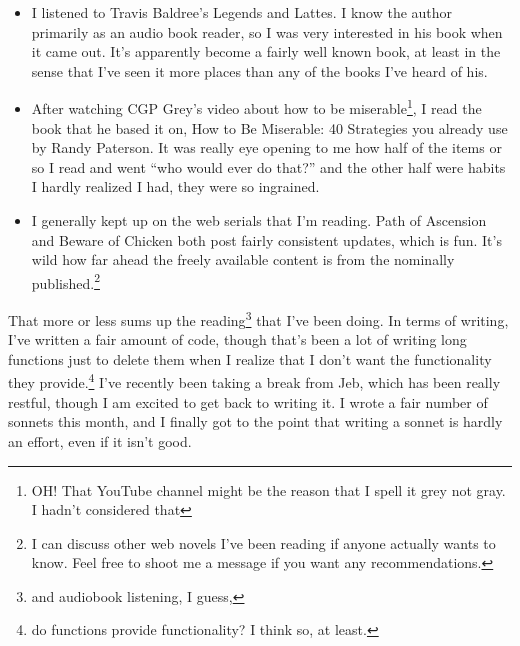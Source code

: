 \documentclass[12pt]{article}[titlepage]
\newcommand{\say}[1]{``#1''}
\newcommand{\1}{\={a}}
\newcommand{\2}{\={e}}
\newcommand{\3}{\={\i}}
\newcommand{\4}{\=o}
\newcommand{\5}{\=u}
\newcommand{\6}{\={A}}
\renewcommand{\,}{\textsuperscript{,}}
\begin{document}
\begin{itemize}
\item I listened to Travis Baldree's Legends and Lattes. I know the author primarily as an audio book reader, so I was very interested in his book when it came out. It's apparently become a fairly well known book, at least in the sense that I've seen it more places than any of the books I've heard of his.
\item After watching CGP Grey's video about how to be miserable\footnote{OH! That YouTube channel might be the reason that I spell it grey not gray. I hadn't considered that}, I read the book that he based it on, How to Be Miserable: 40 Strategies you already use by Randy Paterson. 
It was really eye opening to me how half of the items or so I read and went \say{who would ever do that?} and the other half were habits I hardly realized I had, they were so ingrained.
\item I generally kept up on the web serials that I'm reading. Path of Ascension and Beware of Chicken both post fairly consistent updates, which is fun. It's wild how far ahead the freely available content is from the nominally published.\footnote{I can discuss other web novels I've been reading if anyone actually wants to know. Feel free to shoot me a message if you want any recommendations.}
\end{itemize}

That more or less sums up the reading\footnote{and audiobook listening, I guess,} that I've been doing.
In terms of writing, I've written a fair amount of code, though that's been a lot of writing long functions just to delete them when I realize that I don't want the functionality they provide.\footnote{do functions provide functionality? I think so, at least.}
I've recently been taking a break from Jeb, which has been really restful, though I am excited to get back to writing it.
I wrote a fair number of sonnets this month, and I finally got to the point that writing a sonnet is hardly an effort, even if it isn't good.
\end{document}
